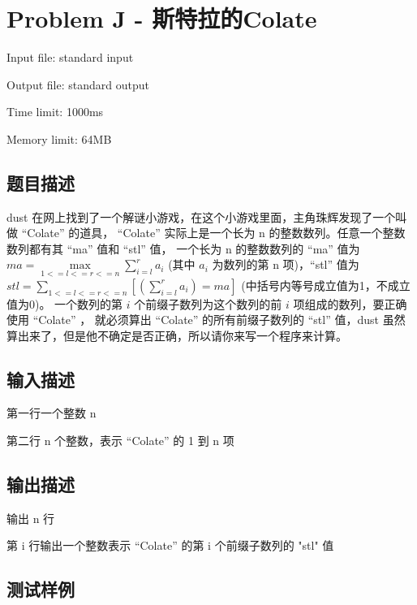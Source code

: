 \newpage
\section{Problem J - 斯特拉的Colate}
{ \limitfont{}
Input file: standard input \par
Output file: standard output \par
Time limit: 1000ms \par
Memory limit: 64MB \par
}
\subsection*{题目描述}

dust 在网上找到了一个解谜小游戏，在这个小游戏里面，主角珠辉发现了一个叫做 ``Colate'' 的道具， 
``Colate'' 实际上是一个长为 n 的整数数列。任意一个整数数列都有其 ``ma'' 值和 ``stl'' 值，
一个长为 n 的整数数列的 ``ma'' 值为 $ma = \max\limits_{1<=l<=r<=n}\sum\limits_{i = l}^r a_i$ 
(其中 $a_i$ 为数列的第 n 项)，``stl'' 值为$stl = \sum\limits_{1<=l<=r<=n} \left[ (\sum\limits_{i=l}^r a_i) = ma\right]$ (中括号内等号成立值为1，不成立值为0)。
一个数列的第 $i$ 个前缀子数列为这个数列的前 $i$ 项组成的数列，要正确使用 ``Colate'' ，
就必须算出 ``Colate'' 的所有前缀子数列的 ``stl'' 值，dust 虽然算出来了，但是他不确定是否正确，所以请你来写一个程序来计算。

\subsection*{输入描述}

第一行一个整数 n

第二行 n 个整数，表示 ``Colate'' 的 1  到 n 项

\subsection*{输出描述}

输出 n 行

第 i 行输出一个整数表示 ``Colate'' 的第 i 个前缀子数列的 "stl" 值

\subsection*{测试样例}

